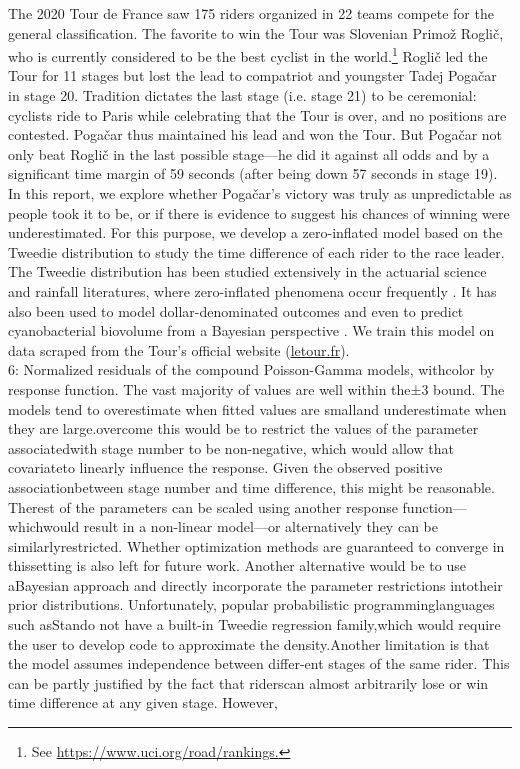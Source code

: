 \documentclass[aos,preprint]{imsart}
\begin{document}
The 2020 Tour de France saw 175 riders organized in 22 teams compete for the general classification. The favorite to win the Tour was Slovenian Primož Roglič, who is currently considered to be the best cyclist in the world.\footnote{See \url{https://www.uci.org/road/rankings.}} Roglič led the Tour for 11 stages but lost the lead to compatriot and youngster Tadej Pogačar in stage 20. Tradition dictates the last stage (i.e. stage 21) to be ceremonial: cyclists ride to Paris while celebrating that the Tour is over, and no positions are contested. Pogačar thus maintained his lead and won the Tour. But Pogačar not only beat Roglič in the last possible stage---he did it against all odds and by a significant time margin of 59 seconds (after being down 57 seconds in stage 19). \\


In this report, we explore whether Pogačar's victory was truly as unpredictable as people took it to be, or if there is evidence to suggest his chances of winning were underestimated. For this purpose, we develop a zero-inflated model based on the Tweedie distribution to study the time difference of each rider to the race leader. The Tweedie distribution has been studied extensively in the actuarial science and rainfall literatures, where zero-inflated phenomena occur frequently \citep[see][and references therein]{jorgensen1994, withers2011}. It has also been used to model dollar-denominated outcomes \citep{lauderdale2012} and even to predict cyanobacterial biovolume from a Bayesian perspective \citep{haakonsson2020}. We train this model on data scraped from the Tour's official website (\url{letour.fr}). \\


6: Normalized residuals of the compound Poisson-Gamma models, withcolor by response function. The vast majority of values are well within the±3 bound. The models tend to overestimate when fitted values are smalland underestimate when they are large.overcome this would be to restrict the values of the parameter associatedwith stage number to be non-negative, which would allow that covariateto linearly influence the response. Given the observed positive associationbetween stage number and time difference, this might be reasonable. Therest of the parameters can be scaled using another response function—whichwould result in a non-linear model—or alternatively they can be similarlyrestricted. Whether optimization methods are guaranteed to converge in thissetting is also left for future work. Another alternative would be to use aBayesian approach and directly incorporate the parameter restrictions intotheir prior distributions. Unfortunately, popular probabilistic programminglanguages such asStando not have a built-in Tweedie regression family,which would require the user to develop code to approximate the density.Another limitation is that the model assumes independence between differ-ent stages of the same rider. This can be partly justified by the fact that riderscan almost arbitrarily lose or win time difference at any given stage. However,
\end{document}
